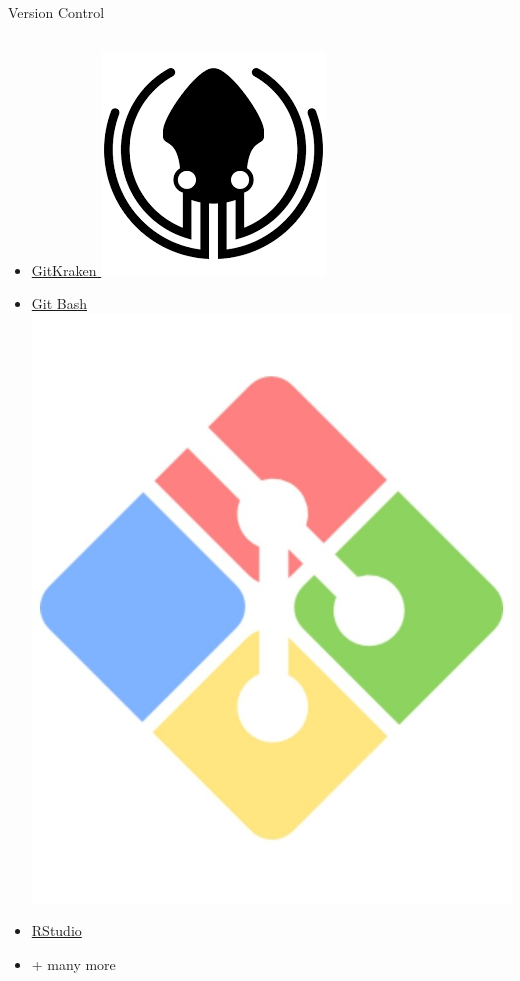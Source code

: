 \documentclass{beamer} %
\begin{document}
\begin{frame}{Version Control}
\begin{columns}
\begin{column}{0.5\textwidth}
\begin{itemize}
          \item \href{https://www.gitkraken.com/}{GitKraken \includegraphics[height=.05\textheight]{gitkraken}}
          \item \href{https://gitforwindows.org/}{Git Bash \includegraphics[height=.07\textheight]{gitbash}}
          \item \href{https://www.rstudio.com/}{RStudio}
          \item + many more
        \end{itemize}
      \end{column}  

\end{columns}
\end{frame}
\end{document}
